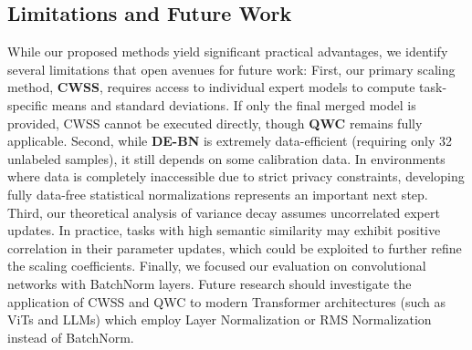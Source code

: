 \documentclass{article}
\theoremstyle{plain}
\theoremstyle{definition}
\theoremstyle{remark}
\begin{document}
\subsection{Limitations and Future Work}
While our proposed methods yield significant practical advantages, we identify several limitations that open avenues for future work:
First, our primary scaling method, \textbf{CWSS}, requires access to individual expert models to compute task-specific means and standard deviations. If only the final merged model is provided, CWSS cannot be executed directly, though \textbf{QWC} remains fully applicable.
Second, while \textbf{DE-BN} is extremely data-efficient (requiring only 32 unlabeled samples), it still depends on some calibration data. In environments where data is completely inaccessible due to strict privacy constraints, developing fully data-free statistical normalizations represents an important next step.
Third, our theoretical analysis of variance decay assumes uncorrelated expert updates. In practice, tasks with high semantic similarity may exhibit positive correlation in their parameter updates, which could be exploited to further refine the scaling coefficients.
Finally, we focused our evaluation on convolutional networks with BatchNorm layers. Future research should investigate the application of CWSS and QWC to modern Transformer architectures (such as ViTs and LLMs) which employ Layer Normalization or RMS Normalization instead of BatchNorm.

\nocite{*}


\end{document}

